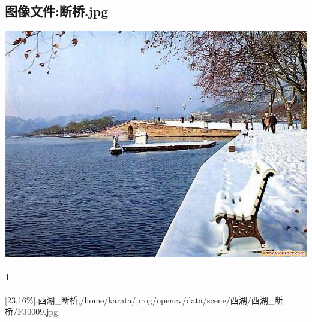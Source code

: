 \subsection{图像文件:断桥.jpg}
\includegraphics[width=15cm,angle=0]{断桥.jpg}

\paragraph{1}
[23.16\%],西湖\_断桥,/home/karata/prog/opencv/data/scene/西湖/西湖\_断桥/FJ0009.jpg

